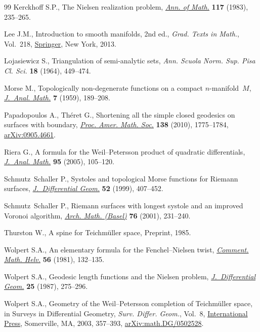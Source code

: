 \documentclass[11pt]{article}
\numberwithin{equation}{section}
\numberwithin{equation}{section}
\begin{document}
\begin{thebibliography}{99}
Kerckhoff S.P., The {N}ielsen realization problem, \href{https://doi.org/10.2307/2007076}{\textit{Ann. of Math.}}
 \textbf{117} (1983), 235--265.

Lee J.M., Introduction to smooth manifolds, 2nd ed., \textit{Grad. Texts in Math.}, Vol.~218, \href{https://doi.org/10.1007/978-1-4419-9982-5}{Springer}, New York, 2013.

Lojasiewicz S., Triangulation of semi-analytic sets, \textit{Ann. Scuola Norm.
 Sup. Pisa Cl. Sci.} \textbf{18} (1964), 449--474.

Morse M., Topologically non-degenerate functions on a compact
 {$n$}-manifold~{$M$}, \href{https://doi.org/10.1007/BF02787685}{\textit{J.~Anal. Math.}} \textbf{7} (1959), 189--208.

Papadopoulos A., Th\'eret G., Shortening all the simple closed geodesics on
 surfaces with boundary, \href{https://doi.org/10.1090/S0002-9939-09-10195-8}{\textit{Proc. Amer. Math. Soc.}} \textbf{138} (2010),
 1775--1784, \href{https://arxiv.org/abs/0905.4661}{arXiv:0905.4661}.

Riera G., A formula for the {W}eil--{P}etersson product of quadratic
 differentials, \href{https://doi.org/10.1007/BF02791498}{\textit{J.~Anal. Math.}} \textbf{95} (2005), 105--120.

Schmutz~Schaller P., Systoles and topological {M}orse functions for {R}iemann
 surfaces, \href{https://doi.org/10.4310/jdg/1214425347}{\textit{J.~Differential Geom.}} \textbf{52} (1999), 407--452.

Schmutz~Schaller P., Riemann surfaces with longest systole and an improved
 {V}oronoi algorithm, \href{https://doi.org/10.1007/s000130050564}{\textit{Arch. Math. (Basel)}} \textbf{76} (2001),
 231--240.

Thurston W., A spine for {T}eichm\"uller space, {P}reprint, 1985.

Wolpert S.A., An elementary formula for the {F}enchel--{N}ielsen twist,
 \href{https://doi.org/10.1007/BF02566203}{\textit{Comment. Math. Helv.}} \textbf{56} (1981), 132--135.

Wolpert S.A., Geodesic length functions and the {N}ielsen problem,
 \href{https://doi.org/10.4310/jdg/1214440853}{\textit{J.~Differential Geom.}} \textbf{25} (1987), 275--296.

Wolpert S.A., Geometry of the {W}eil--{P}etersson completion of {T}eichm\"uller
 space, in Surveys in {D}ifferential {G}eometry, \textit{Surv. Differ. Geom.},
 Vol.~8, \href{https://doi.org/10.4310/SDG.2003.v8.n1.a13}{International Press}, Somerville, MA, 2003, 357--393,
 \href{https://arxiv.org/abs/math.DG/0502528}{arXiv:math.DG/0502528}.

\end{thebibliography}
\end{document}
